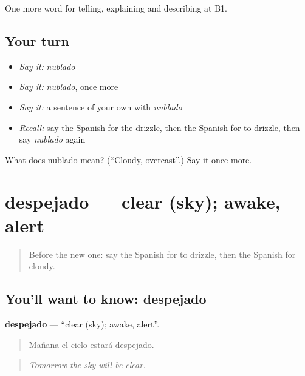 \begin{grammarlens}[title={What you've built}]
One more word for telling, explaining and describing at B1.
\end{grammarlens}

\subsection*{Your turn}
\begin{itemize}
\raggedright
  \item \emph{Say it:} \emph{nublado}
  \item \emph{Say it:} \emph{nublado}, once more
  \item \emph{Say it:} a sentence of your own with \emph{nublado}
  \item \emph{Recall:} say the Spanish for the drizzle, then the Spanish for to drizzle, then say \emph{nublado} again
\end{itemize}

\begin{tcolorbox}[breakable,colback=teal!4,colframe=teal!35!black,title={Before you move on}]
What does nublado mean? (\textquotedblleft{}Cloudy, overcast\textquotedblright{}.) Say it once more.
\end{tcolorbox}
\section[despejado]{despejado — clear (sky); awake, alert}

\label{lesson:ES-C698-despejado}



\begin{quote}
Before the new one: say the Spanish for to drizzle, then the Spanish for cloudy.
\end{quote}

\subsection*{You'll want to know: despejado}
\textbf{despejado} — \textquotedblleft{}clear (sky); awake, alert\textquotedblright{}.

\begin{quote}
Mañana el cielo estará despejado.
\end{quote}

\begin{quote}
\emph{Tomorrow the sky will be clear.}
\end{quote}

